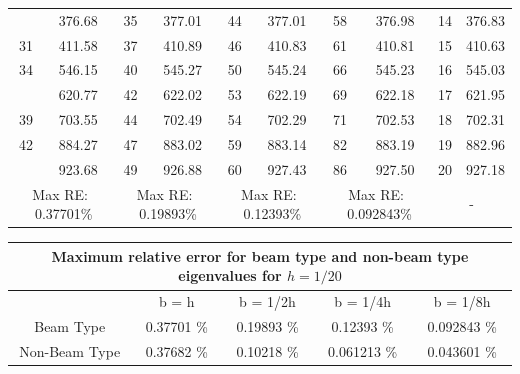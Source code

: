 \documentclass[8pt]{beamer}
\begin{document}
\begin{frame}
\begin{table}[ht]
{{\begin{tabular}{|cc|cc|cc|cc||cc|}
                    \rowcolor{lightgray}{30} & 376.68 & {35} & 377.01 & {44} & 377.01 & {58} & 376.98 & {14} & {376.83} \\
                    {31} & 411.58 & {37} & 410.89 & {46} & 410.83 & {61} & 410.81 & {15} & {410.63} \\
                    {34} & 546.15 & {40} & 545.27 & {50} & 545.24 & {66} & 545.23 & {16} & {545.03} \\
                    \rowcolor{lightgray}{37} & 620.77 & {42} & 622.02 & {53} & 622.19 & {69} & 622.18 & {17} & {621.95} \\
                    {39} & 703.55 & {44} & 702.49 & {54} & 702.29 & {71} & 702.53 & {18} & {702.31} \\
                    {42} & 884.27 & {47} & 883.02 & {59} & 883.14 & {82} & 883.19 & {19} & {882.96} \\
                    \rowcolor{lightgray}{44} & 923.68 & {49} & 926.88 & {60} & 927.43 & {86} & 927.50 & {20} & {927.18} \\
                    \hline
                    \hline
                    \multicolumn{2}{|c|}{Max RE: \  0.37701\%} &\multicolumn{2}{c|}{Max RE: \ 0.19893\%}  & \multicolumn{2}{c|}{Max RE: \  0.12393\%}  & \multicolumn{2}{c||}{Max RE: \ 0.092843\%}& \multicolumn{2}{c|}{-} \\
                    \hline
                \end{tabular}%
                \label{tab:2v3_2}%
            }}
            \end{table}%
        \end{frame}

        \begin{frame}
            \begin{table}[htbp]
                \centering
                \begin{tabular}{|c|cccc|}
                    \hline
                    \multicolumn{5}{|c|}{Maximum relative error for beam type and non-beam type eigenvalues for $h = 1/20$} \\
                    \hline
                    \hline
                    & {b = h} & {b = 1/2h} & {b = 1/4h} & {b = 1/8h} \\
                    \hline
                    Beam Type & 0.37701 \% & 0.19893 \% & 0.12393 \% & 0.092843 \% \\
                    Non-Beam Type & 0.37682 \% & 0.10218 \% & 0.061213 \% & 0.043601 \% \\
                    \hline
                \end{tabular}%
                \label{tab:2v3_2_split}%
            \end{table}%
        \end{frame}
\end{document}
